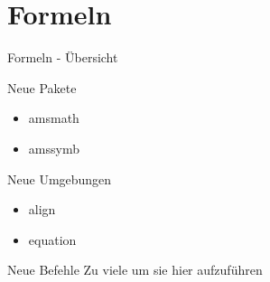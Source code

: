 \section{Formeln}
\begin{frame}{Formeln - \"Ubersicht}
    \begin{exampleblock}{Neue Pakete}
        \begin{multicols}{2}
            \begin{itemize}\cblue
                \item amsmath
                \item amssymb\black
            \end{itemize}
        \end{multicols}
    \end{exampleblock}
    
    \begin{exampleblock}{Neue Umgebungen}
        \begin{multicols}{2}
            \begin{itemize}\cpurple
                \item align
                \item equation\black
            \end{itemize}
        \end{multicols}
    \end{exampleblock}
    \begin{exampleblock}{Neue Befehle}
        \centering Zu viele um sie hier aufzuf\"uhren
    \end{exampleblock}
\end{frame}
